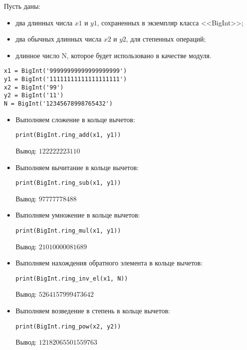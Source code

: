Пусть даны:
\begin{itemize}
    \item два длинных числа $x1$ и $y1$, сохраненных в экземпляр класса <<BigInt>>;
    \item два обычных длинных числа $x2$ и $y2$, для степенных операций;
    \item длинное число N, которое будет использовано в качестве модуля.
\end{itemize}

    \begin{lstlisting}
x1 = BigInt('99999999999999999999')
y1 = BigInt('11111111111111111111')
x2 = BigInt('99')
y2 = BigInt('11')
N = BigInt('12345678998765432')\end{lstlisting}

    \begin{itemize}
        \item Выполняем сложение в кольце вычетов:
        \begin{lstlisting}
print(BigInt.ring_add(x1, y1))\end{lstlisting}
        Вывод: $122222223110$
        \item Выполняем вычитание в кольце вычетов:
        \begin{lstlisting}
print(BigInt.ring_sub(x1, y1))\end{lstlisting}
        Вывод: $97777778488$
        \item Выполняем умножение в кольце вычетов:
        \begin{lstlisting}
print(BigInt.ring_mul(x1, y1))\end{lstlisting}
        Вывод: $21010000081689$
        \item Выполняем нахождения обратного элемента в кольце вычетов:
        \begin{lstlisting}
print(BigInt.ring_inv_el(x1, N))\end{lstlisting}
        Вывод: $5264157999473642$
        \item Выполняем возведение в степень в кольце вычетов:
        \begin{lstlisting}
print(BigInt.ring_pow(x2, y2))\end{lstlisting}
        Вывод: $12182065501559763$
    \end{itemize}

\clearpage
